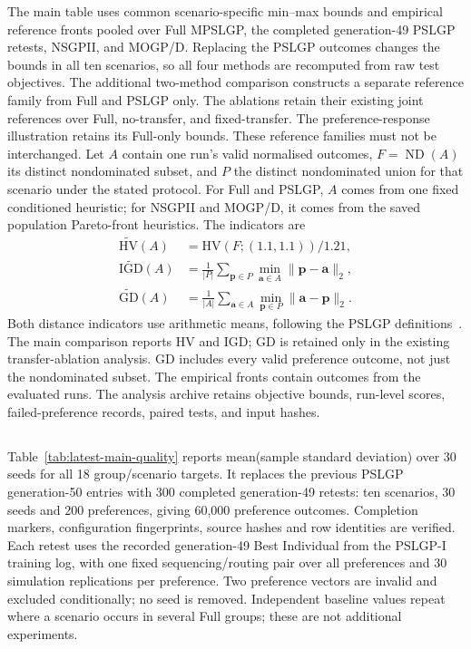 The main table uses common scenario-specific min--max bounds and empirical reference fronts pooled over Full MPSLGP, the completed generation-49 PSLGP retests, NSGPII, and MOGP/D. Replacing the PSLGP outcomes changes the bounds in all ten scenarios, so all four methods are recomputed from raw test objectives. The additional two-method comparison constructs a separate reference family from Full and PSLGP only. The ablations retain their existing joint references over Full, no-transfer, and fixed-transfer. The preference-response illustration retains its Full-only bounds. These reference families must not be interchanged. Let $A$ contain one run's valid normalised outcomes, $F=\operatorname{ND}(A)$ its distinct nondominated subset, and $P$ the distinct nondominated union for that scenario under the stated protocol. For Full and PSLGP, $A$ comes from one fixed conditioned heuristic; for NSGPII and MOGP/D, it comes from the saved population Pareto-front heuristics. The indicators are
\begin{equation}
\begin{aligned}
\widetilde{\mathrm{HV}}(A)&=\mathrm{HV}(F;(1.1,1.1))/1.21,\\
\widetilde{\mathrm{IGD}}(A)&=\frac{1}{|P|}\sum_{\mathbf p\in P}\min_{\mathbf a\in A}\|\mathbf p-\mathbf a\|_2,\\
\widetilde{\mathrm{GD}}(A)&=\frac{1}{|A|}\sum_{\mathbf a\in A}\min_{\mathbf p\in P}\|\mathbf a-\mathbf p\|_2.
\end{aligned}
\label{eq:descriptive-test-metrics}
\end{equation}
Both distance indicators use arithmetic means, following the PSLGP definitions~\cite{xu2026pslgp}. The main comparison reports HV and IGD; GD is retained only in the existing transfer-ablation analysis. GD includes every valid preference outcome, not just the nondominated subset. The empirical fronts contain outcomes from the evaluated runs. The analysis archive retains objective bounds, run-level scores, failed-preference records, paired tests, and input hashes.

\subsection{}
Table~\ref{tab:latest-main-quality} reports mean(sample standard deviation) over 30 seeds for all 18 group/scenario targets. It replaces the previous PSLGP generation-50 entries with 300 completed generation-49 retests: ten scenarios, 30 seeds and 200 preferences, giving 60,000 preference outcomes. Completion markers, configuration fingerprints, source hashes and row identities are verified. Each retest uses the recorded generation-49 Best Individual from the PSLGP-I training log, with one fixed sequencing/routing pair over all preferences and 30 simulation replications per preference. Two preference vectors are invalid and excluded conditionally; no seed is removed. Independent baseline values repeat where a scenario occurs in several Full groups; these are not additional experiments.


